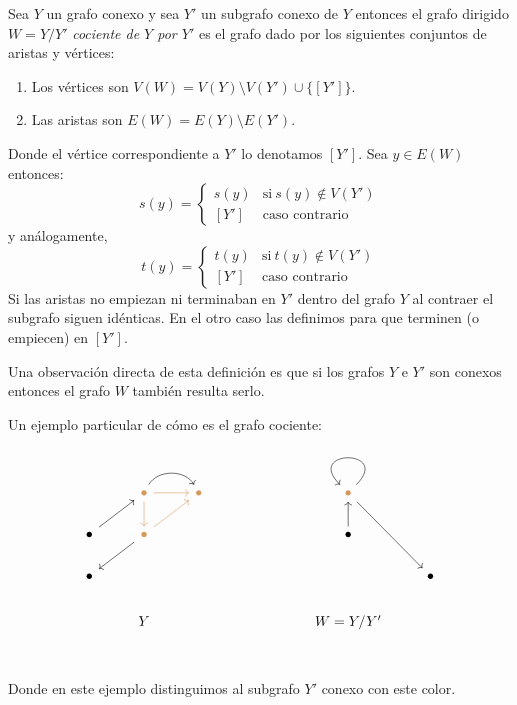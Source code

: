 \documentclass[tesis.tex]{subfiles}
\begin{document}
\begin{deff}
	Sea $Y$ un grafo conexo y sea $Y'$ un subgrafo conexo de $Y$ entonces
	el grafo dirigido $W = Y/Y'$ \emph{cociente de $Y$ por $Y'$} es el grafo dado por los siguientes conjuntos de aristas y vértices:
	
	\begin{enumerate}
		\item Los vértices son $V(W)= V(Y) \setminus V(Y') \cup \{ [Y'] \}$.
		\item Las aristas son $E(W) = E(Y) \setminus E(Y')$.
	\end{enumerate}
	Donde el vértice correspondiente a $Y'$ lo denotamos $[Y']$. 
	Sea $y \in E(W)$ entonces:
	\begin{equation*}
		s(y) = 
		\begin{cases}
			s(y)  & \text{si} \ s(y) \notin V(Y') \\ 
			[Y'] & \text{caso contrario}
		\end{cases}
	\end{equation*}
	y análogamente,
	\begin{equation*}
		t(y) = 
		\begin{cases}
			t(y)  & \text{si} \ t(y) \notin V(Y') \\ 
			[Y'] & \text{caso contrario}
		\end{cases}
	\end{equation*}
	Si las aristas no empiezan ni terminaban en $Y'$ dentro del grafo $Y$ al contraer el subgrafo siguen idénticas. 
	En el otro caso las definimos para que terminen (o empiecen) en $[Y']$. 
	
\end{deff}

Una observación directa de esta definición es que si los grafos $Y$ e $Y'$ son conexos entonces el grafo $W$ también resulta serlo.

\begin{ej}
	
Un ejemplo particular de cómo es el grafo cociente:

\[\begin{tikzcd}
	& \color{rgb,255:red,214;green,153;blue,92}\bullet &  \color{rgb,255:red,214;green,153;blue,92} \bullet &&&  \color{rgb,255:red,214;green,153;blue,92} \bullet \\
	\bullet & \color{rgb,255:red,214;green,153;blue,92} \bullet &&&& \bullet \\
	\bullet &&&&&& \bullet \\
	& Y &&&& W = Y/Y' \\ 	
	\arrow[color={rgb,255:red,214;green,153;blue,92}, from=1-2, to=1-3]
	\arrow[color={rgb,255:red,214;green,153;blue,92}, from=1-2, to=2-2]
	\arrow[color={rgb,255:red,214;green,153;blue,92}, from=2-2, to=1-3]
	\arrow[from=2-1, to=1-2]
	\arrow[bend left=60, from=1-2, to=1-3]
	\arrow[from=2-2, to=3-1]
	\arrow[from=1-6, to=3-7]
	\arrow[from=2-6, to=1-6]
	\arrow[loop, from=1-6, to=1-6]
\end{tikzcd}\]
Donde en este ejemplo distinguimos al subgrafo $Y'$ conexo con este \textcolor{rgb,255:red,214;green,153;blue,92}{color}.
\end{ej}
\end{document}
